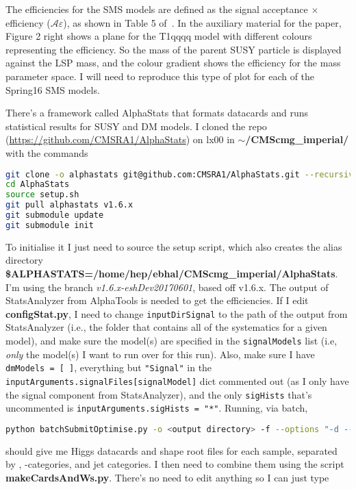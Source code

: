 The efficiencies for the SMS models are defined as the signal acceptance $\times$ efficiency ($\mathcal{A} \varepsilon$), as shown in Table 5 of~\cite{CMS-PAPER-SUS-15-005-arXiv}. In the auxiliary material for the paper, Figure 2 right shows a plane for the T1qqqq model with different colours representing the efficiency. So the mass of the parent SUSY particle is displayed against the LSP mass, and the colour gradient shows the efficiency for the mass parameter space. I will need to reproduce this type of plot for each of the Spring16 SMS models.

There's a framework called AlphaStats that formats datacards and runs statistical results for SUSY and DM models. I cloned the repo (\url{https://github.com/CMSRA1/AlphaStats}) on lx00 in \textbf{$\sim$/CMScmg\_imperial/} with the commands

\begin{lstlisting}[belowskip=-0.7cm, language=sh, numbers=none]
git clone -o alphastats git@github.com:CMSRA1/AlphaStats.git --recursive
cd AlphaStats
source setup.sh 
git pull alphastats v1.6.x
git submodule update
git submodule init
\end{lstlisting}

To initialise it I just need to source the setup script, which also creates the alias directory \textbf{\$ALPHASTATS=/home/hep/ebhal/CMScmg\_imperial/AlphaStats}. I'm using the branch \emph{v1.6.x-eshDev20170601}, based off v1.6.x. The output of StatsAnalyzer from AlphaTools is needed to get the efficiencies. If I edit \textbf{configStat.py}, I need to change \texttt{inputDirSignal} to the path of the output from StatsAnalyzer (i.e., the folder that contains all of the systematics for a given model), and make sure the model(s) are specified in the \texttt{signalModels} list (i.e, \emph{only} the model(s) I want to run over for this run). Also, make sure I have \texttt{dmModels = [ ]}, everything but \texttt{"Signal"} in the \texttt{inputArguments.signalFiles[signalModel]} dict commented out (as I only have the signal component from StatsAnalyzer), and the only \texttt{sigHists} that's uncommented is \texttt{inputArguments.sigHists = "*"}. Running, via batch,

\begin{lstlisting}[belowskip=-0.7cm, language=sh, numbers=none]
python batchSubmitOptimise.py -o <output directory> -f --options "-d --getDataLumi --greenBand --signalMCStat" --submit
\end{lstlisting}

should give me Higgs datacards and shape root files for each sample, separated by \HT, \Pqb-categories, and jet categories. I then need to combine them using the script \textbf{makeCardsAndWs.py}. There's no need to edit anything so I can just type

